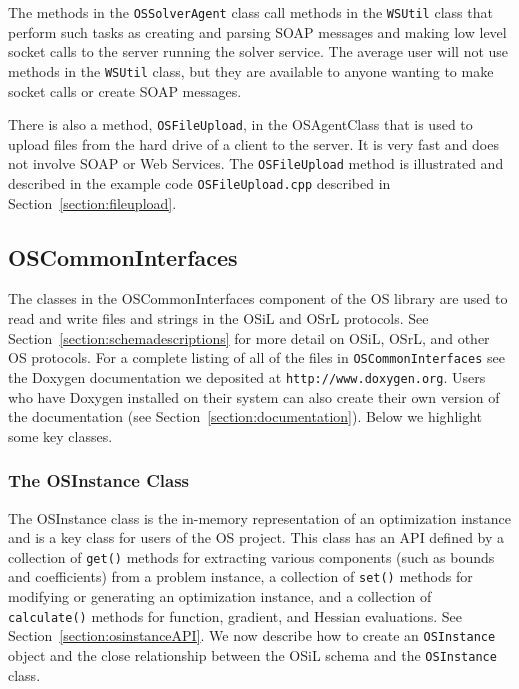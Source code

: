 \documentclass[11pt]{article}
\renewcommand{\_}{{\char"5F}}
\renewcommand{\{}{{\char"7B}}
\renewcommand{\}}{{\char"7D}}
\renewcommand{\^}{{\char"0D}}
\renewcommand{\'}{{\char"0D}}
\newcommand{\UrlDoxygen}{http://www.doxygen.org}
\begin{document}
\begin{enumerate}[Step 1:]
The methods in the {\tt OSSolverAgent} class call methods in the {\tt WSUtil} class that perform such tasks as creating and parsing SOAP messages and making low level socket calls to the server running the solver service. The average user will not use methods in the {\tt WSUtil} class, but they are available to anyone wanting to make socket calls or create SOAP messages.

There is also a method, {\tt OSFileUpload}, in the OSAgentClass that is used to upload files from the hard drive of a client to the server. It is very fast and does not involve SOAP or Web Services. The {\tt OSFileUpload}  method is illustrated and described in the example code {\tt OSFileUpload.cpp} described in Section~\ref{section:fileupload}.

\subsection{OSCommonInterfaces}

The classes in the OSCommonInterfaces component of the OS library are used to read and write files and strings
in the OSiL and OSrL protocols. See Section~\ref{section:schemadescriptions} for more detail on OSiL, OSrL,
and other OS protocols. For a complete listing of all of the files in {\tt OSCommonInterfaces} see the 
Doxygen documentation we deposited at {\tt\UrlDoxygen}. Users who have Doxygen installed on their system
can also create their own version of the documentation (see Section~\ref{section:documentation}). Below we highlight 
some key classes.





\subsubsection{The OSInstance Class}\label{section:osinstanceclass}

The OSInstance class is the in-memory representation of an optimization instance and is a key
class for users of the OS project. This class has an API defined by a collection of {\tt get()} methods for
extracting various components (such as bounds and coefficients) from a problem instance, a collection of
{\tt set()} methods for modifying or generating an optimization instance, and a collection of {\tt calculate()}
methods for function, gradient, and Hessian evaluations.  See Section~\ref{section:osinstanceAPI}.
We now describe how to create an {\tt OSInstance} object and the close relationship between the OSiL schema
and the {\tt OSInstance} class.


\end{enumerate}
\end{document}
